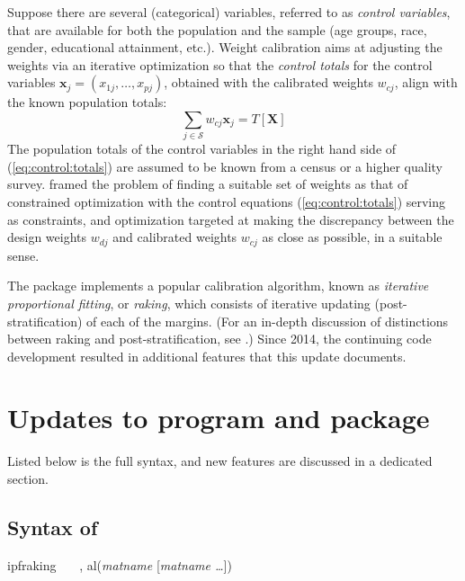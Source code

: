 Suppose there are several (categorical) variables, referred to
as {\it control variables}, that are available for both
the population and the sample
(age groups, race, gender, educational attainment, etc.).
Weight calibration aims at adjusting the weights 
via an iterative optimization 
so that the {\it control totals} for the control variables 
$\mathbf{x}_j=(x_{1j}, \ldots, x_{pj})$, obtained with the calibrated 
weights $w_{cj}$, align with the known population totals:
\begin{equation}
    \sum_{j \in \mathcal{S}} w_{cj} \mathbf{x}_j
    = T [ \mathbf{X}  ]
    \label{eq:control:totals}
\end{equation}
The population totals of the control variables in the right hand side
of (\ref{eq:control:totals}) are assumed to be known from a census or a higher quality survey.
\citet{deville:sarndal:1992} framed the problem of finding a suitable
set of weights as that of constrained optimization with the control
equations (\ref{eq:control:totals}) serving as constraints,
and optimization targeted at making the discrepancy between
the design weights $w_{dj}$ and calibrated weights
$w_{cj}$ as close as possible, in a suitable sense.

The package  \citep{kolenikov:2014} implements
a popular calibration algorithm, known as \textit{iterative proportional fitting},
or \textit{raking}, which consists of iterative updating (post-stratification) of
each of the margins. (For an in-depth discussion of distinctions between
raking and post-stratification, see \citet{kolenikov:2016}.)
Since 2014, the continuing code development resulted
in additional features that this update documents.


\section{Updates to  program and package}

Listed below is the full syntax, and new features are discussed in a dedicated section.

\subsection{Syntax of }
\label{subsec:syntax}

\begin{stsyntax}
ipfraking
\optif\
\optin\
\optweight\
,
al({\it matname} [{\it matname \ldots}])
\end{stsyntax}

